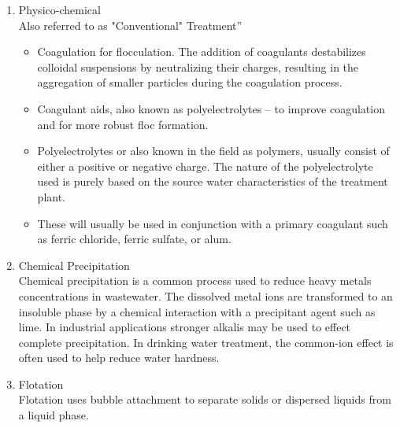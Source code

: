 \documentclass{article}
\begin{document}
\begin{enumerate}
\begin{itemize}
\end{itemize}
\item Physico-chemical\\
Also referred to as "Conventional" Treatment”
\begin{itemize}
\item Coagulation for flocculation. The addition of coagulants destabilizes colloidal suspensions by neutralizing their charges, resulting in the aggregation of smaller particles during the coagulation process.
\item Coagulant aids, also known as polyelectrolytes – to improve coagulation and for more robust floc formation.
\item Polyelectrolytes or also known in the field as polymers, usually consist of either a positive or negative charge. The nature of the polyelectrolyte used is purely based on the source water characteristics of the treatment plant.
\item These will usually be used in conjunction with a primary coagulant such as ferric chloride, ferric sulfate, or alum.
\end{itemize}
\item Chemical Precipitation\\
Chemical precipitation is a common process used to reduce heavy metals concentrations in wastewater. The dissolved metal ions are transformed to an insoluble phase by a chemical interaction with a precipitant agent such as lime. In industrial applications stronger alkalis may be used to effect complete precipitation. In drinking water treatment, the common-ion effect is often used to help reduce water hardness.
\item Flotation\\
Flotation uses bubble attachment to separate solids or dispersed liquids from a liquid phase.


\end{enumerate}
\end{document}
